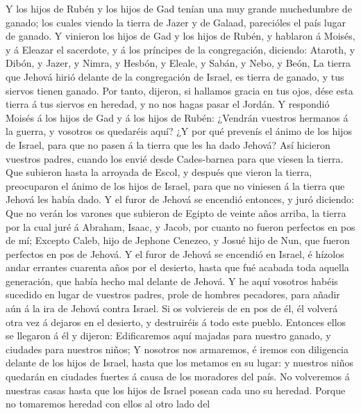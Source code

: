  Y los hijos de Rubén y los hijos de Gad tenían una muy
grande muchedumbre de ganado; los cuales viendo la tierra de Jazer y de
Galaad, parecióles el país lugar de ganado.  Y vinieron los
hijos de Gad y los hijos de Rubén, y hablaron á Moisés, y á Eleazar el
sacerdote, y á los príncipes de la congregación, diciendo: 
Ataroth, y Dibón, y Jazer, y Nimra, y Hesbón, y Eleale, y Sabán, y Nebo,
y Beón,  La tierra que Jehová hirió delante de la
congregación de Israel, es tierra de ganado, y tus siervos tienen
ganado.  Por tanto, dijeron, si hallamos gracia en tus ojos,
dése esta tierra á tus siervos en heredad, y no nos hagas pasar el
Jordán.  Y respondió Moisés á los hijos de Gad y á los hijos
de Rubén: ¿Vendrán vuestros hermanos á la guerra, y vosotros os
quedaréis aquí?  ¿Y por qué prevenís el ánimo de los hijos
de Israel, para que no pasen á la tierra que les ha dado Jehová?
 Así hicieron vuestros padres, cuando los envié desde
Cades-barnea para que viesen la tierra.  Que subieron hasta
la arroyada de Escol, y después que vieron la tierra, preocuparon el
ánimo de los hijos de Israel, para que no viniesen á la tierra que
Jehová les había dado.  Y el furor de Jehová se encendió
entonces, y juró diciendo:  Que no verán los varones que
subieron de Egipto de veinte años arriba, la tierra por la cual juré á
Abraham, Isaac, y Jacob, por cuanto no fueron perfectos en pos de mí;
 Excepto Caleb, hijo de Jephone Cenezeo, y Josué hijo de
Nun, que fueron perfectos en pos de Jehová.  Y el furor de
Jehová se encendió en Israel, é hízolos andar errantes cuarenta años por
el desierto, hasta que fué acabada toda aquella generación, que había
hecho mal delante de Jehová.  Y he aquí vosotros habéis
sucedido en lugar de vuestros padres, prole de hombres pecadores, para
añadir aún á la ira de Jehová contra Israel.  Si os
volviereis de en pos de él, él volverá otra vez á dejaros en el
desierto, y destruiréis á todo este pueblo.  Entonces ellos
se llegaron á él y dijeron: Edificaremos aquí majadas para nuestro
ganado, y ciudades para nuestros niños;  Y nosotros nos
armaremos, é iremos con diligencia delante de los hijos de Israel, hasta
que los metamos en su lugar: y nuestros niños quedarán en ciudades
fuertes á causa de los moradores del país.  No volveremos á
nuestras casas hasta que los hijos de Israel posean cada uno su heredad.
 Porque no tomaremos heredad con ellos al otro lado del
